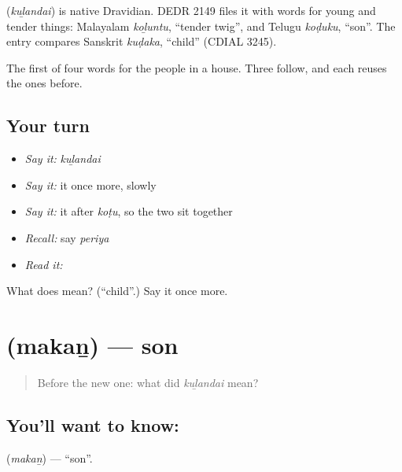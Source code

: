 \begin{cousinweb}
\textbf{} (\emph{kuḻandai}) is native Dravidian. DEDR 2149 files it with words for young and tender things: Malayalam \emph{koḻuntu}, \textquotedblleft{}tender twig\textquotedblright{}, and Telugu \emph{koḍuku}, \textquotedblleft{}son\textquotedblright{}. The entry compares Sanskrit \emph{kuḍaka}, \textquotedblleft{}child\textquotedblright{} (CDIAL 3245).
\end{cousinweb}

\begin{grammarlens}[title={What you've built}]
The first of four words for the people in a house. Three follow, and each reuses the ones before.
\end{grammarlens}

\subsection*{Your turn}
\begin{itemize}
\raggedright
  \item \emph{Say it:} \emph{kuḻandai}
  \item \emph{Say it:} it once more, slowly
  \item \emph{Say it:} it after \emph{koṭu}, so the two sit together
  \item \emph{Recall:} say \emph{periya}
  \item \emph{Read it:} \textbf{}
\end{itemize}

\begin{tcolorbox}[breakable,colback=teal!4,colframe=teal!35!black,title={Before you move on}]
What does  mean? (\textquotedblleft{}child\textquotedblright{}.) Say it once more.
\end{tcolorbox}
\section[\texorpdfstring{\ta{மகன்} (makaṉ)}{மகன் (makaṉ)}]{ (makaṉ) — son}

\label{lesson:TA-C43-son}



\begin{quote}
Before the new one: what did \emph{kuḻandai} mean?
\end{quote}

\subsection*{You'll want to know: }
\textbf{} (\emph{makaṉ}) — \textquotedblleft{}son\textquotedblright{}.

